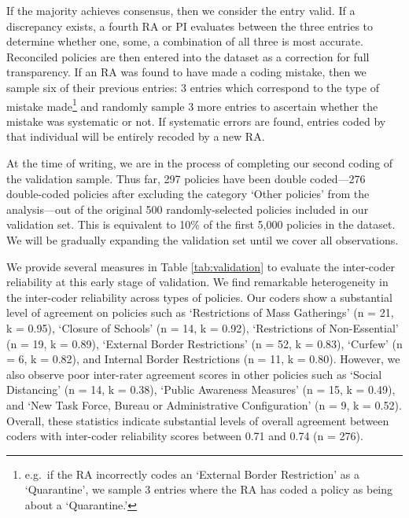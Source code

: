 \documentclass[
]{article}
\begin{document}
If the majority achieves consensus, then we consider the entry valid. If a discrepancy exists, a fourth RA or PI evaluates between the three entries to determine whether one, some, a combination of all three is most accurate. Reconciled policies are then entered into the dataset as a correction for full transparency. If an RA was found to have made a coding mistake, then we sample six of their previous entries: 3 entries which correspond to the type of mistake made\footnote{e.g.~if the RA incorrectly codes an `External Border Restriction' as a `Quarantine', we sample 3 entries where the RA has coded a policy as being about a `Quarantine.'} and randomly sample 3 more entries to ascertain whether the mistake was systematic or not. If systematic errors are found, entries coded by that individual will be entirely recoded by a new RA.

At the time of writing, we are in the process of completing our second coding of the validation sample. Thus far, 297 policies have been double coded---276 double-coded policies after excluding the category `Other policies' from the analysis---out of the original 500 randomly-selected policies included in our validation set. This is equivalent to 10\% of the first 5,000 policies in the dataset. We will be gradually expanding the validation set until we cover all observations.

We provide several measures in Table \ref{tab:validation} to evaluate the inter-coder reliability at this early stage of validation. We find remarkable heterogeneity in the inter-coder reliability across types of policies. Our coders show a substantial level of agreement on policies such as `Restrictions of Mass Gatherings' (n = 21, k = 0.95), `Closure of Schools' (n = 14, k = 0.92), `Restrictions of Non-Essential' (n = 19, k = 0.89), `External Border Restrictions' (n = 52, k = 0.83), `Curfew' (n = 6, k = 0.82), and Internal Border Restrictions (n = 11, k = 0.80). However, we also observe poor inter-rater agreement scores in other policies such as `Social Distancing' (n = 14, k = 0.38), `Public Awareness Measures' (n = 15, k = 0.49), and `New Task Force, Bureau or Administrative Configuration' (n = 9, k = 0.52). Overall, these statistics indicate substantial levels of overall agreement between coders with inter-coder reliability scores between 0.71 and 0.74 (n = 276).
\end{document}
